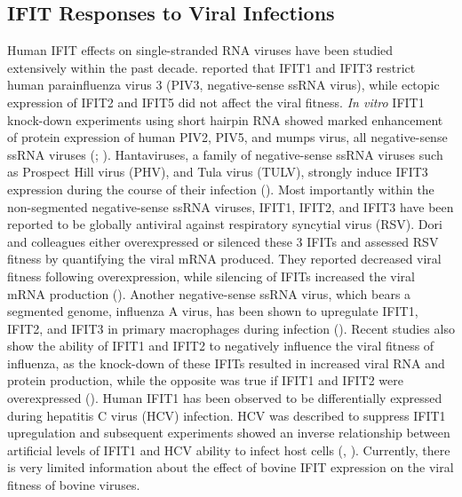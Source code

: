 \subsection{IFIT Responses to Viral Infections} \label{subsec:IFIT Responses to Viral Infections}
Human IFIT effects on single-stranded RNA viruses have been studied extensively within the past decade. \cite{Rabbani2016Identification3} reported that IFIT1 and IFIT3 restrict human parainfluenza virus 3 (PIV3, negative-sense ssRNA virus), while ectopic expression of IFIT2 and IFIT5 did not affect the viral fitness. \textit{In vitro} IFIT1 knock-down experiments using short hairpin RNA showed marked enhancement of protein expression of human PIV2, PIV5, and mumps virus, all negative-sense ssRNA viruses (\cite{Andrejeva2013ISG56/IFIT1Synthesis}; \cite{Young2016HumanFamily}). Hantaviruses, a family of negative-sense ssRNA viruses such as Prospect Hill virus (PHV), and Tula virus (TULV), strongly induce IFIT3 expression during the course of their infection (\cite{Matthys2011TheInduction}). Most importantly within the non-segmented negative-sense ssRNA viruses, IFIT1, IFIT2, and IFIT3 have been reported to be globally antiviral against respiratory syncytial virus (RSV). Dori and colleagues either overexpressed or silenced these 3 IFITs and assessed RSV fitness by quantifying the viral mRNA produced. They reported decreased viral fitness following overexpression, while silencing of IFITs increased the viral mRNA production (\cite{Drori2020InfluenzaProteins}). Another negative-sense ssRNA virus, which bears a segmented genome, influenza A virus, has been shown to upregulate IFIT1, IFIT2, and IFIT3 in primary macrophages during infection (\cite{Lietzen2011QuantitativeMacrophages}). Recent studies also show the ability of IFIT1 and IFIT2 to negatively influence the viral fitness of influenza, as the knock-down of these IFITs resulted in increased viral RNA and protein production, while the opposite was true if IFIT1 and IFIT2 were overexpressed (\cite{Zhu2023TheSynthesis}). Human IFIT1 has been observed to be differentially expressed during hepatitis C virus (HCV) infection. HCV was described to suppress IFIT1 upregulation and subsequent experiments showed an inverse relationship between artificial levels of IFIT1 and HCV ability to infect host cells (\cite{Raychoudhuri2011ISG56Replication}, \cite{Ishida2019HepaticInfection}). Currently, there is very limited information about the effect of bovine IFIT expression on the viral fitness of bovine viruses.


